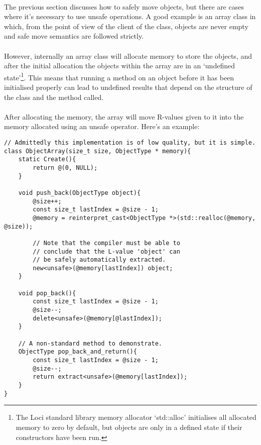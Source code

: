 \documentclass[12pt,twoside,notitlepage]{report}
\begin{document}
\paragraph{}
The previous section discusses how to safely move objects, but there are cases where it's necessary to use unsafe operations. A good example is an array class in which, from the point of view of the client of the class, objects are never empty and safe move semantics are followed strictly.

\paragraph{}
However, internally an array class will allocate memory to store the objects, and after the initial allocation the objects within the array are in an `undefined state'\footnote{The Loci standard library memory allocator `std::alloc' initialises all allocated memory to zero by default, but objects are only in a defined state if their constructors have been run.}. This means that running a method on an object before it has been initialised properly can lead to undefined results that depend on the structure of the class and the method called.

\paragraph{}
After allocating the memory, the array will move R-values given to it into the memory allocated using an unsafe operator. Here's an example:

\begin{lstlisting}
// Admittedly this implementation is of low quality, but it is simple.
class ObjectArray(size_t size, ObjectType * memory){
	static Create(){
		return @(0, NULL);
	}
	
	void push_back(ObjectType object){
		@size++;
		const size_t lastIndex = @size - 1;
		@memory = reinterpret_cast<ObjectType *>(std::realloc(@memory, @size));
		
		// Note that the compiler must be able to
		// conclude that the L-value 'object' can
		// be safely automatically extracted.
		new<unsafe>(@memory[lastIndex]) object;
	}
	
	void pop_back(){
		const size_t lastIndex = @size - 1;
		@size--;
		delete<unsafe>(@memory[@lastIndex]);
	}
	
	// A non-standard method to demonstrate.
	ObjectType pop_back_and_return(){
		const size_t lastIndex = @size - 1;
		@size--;
		return extract<unsafe>(@memory[lastIndex]);
	}
}
\end{lstlisting}
\end{document}
